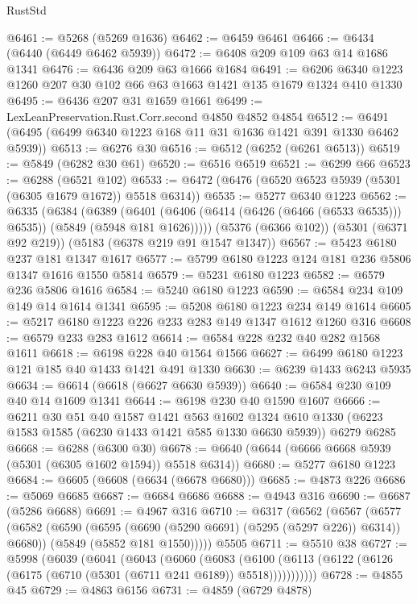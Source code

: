 \begin{lexlean}{RustStd}
\begin{coremodule}
@6461 := @5268 (@5269 @1636)
@6462 := @6459 @6461
@6466 := @6434 (@6440 (@6449 @6462 @5939))
@6472 := @6408 @209 @109 @63 @14 @1686 @1341
@6476 := @6436 @209 @63 @1666 @1684
@6491 := @6206 @6340 @1223 @1260 @207 @30 @102 @66 @63 @1663 @1421 @135 @1679 @1324 @410 @1330
@6495 := @6436 @207 @31 @1659 @1661
@6499 := LexLeanPreservation.Rust.Corr.second @4850 @4852 @4854
@6512 := @6491 (@6495 (@6499 @6340 @1223 @168 @11 @31 @1636 @1421 @391 @1330 @6462 @5939))
@6513 := @6276 @30
@6516 := @6512 (@6252 (@6261 @6513))
@6519 := @5849 (@6282 @30 @61)
@6520 := @6516 @6519
@6521 := @6299 @66
@6523 := @6288 (@6521 @102)
@6533 := @6472 (@6476 (@6520 @6523 @5939 (@5301 (@6305 @1679 @1672)) @5518 @6314))
@6535 := @5277 @6340 @1223
@6562 := @6335
    (@6384
      (@6389
        (@6401 (@6406 (@6414 (@6426 (@6466 (@6533 @6535))) @6535)) (@5849 (@5948 @181 @1626)))))
    (@5376 (@6366 @102))
    (@5301 (@6371 @92 @219))
    (@5183 (@6378 @219 @91 @1547 @1347))
@6567 := @5423 @6180 @237 @181 @1347 @1617
@6577 := @5799 @6180 @1223 @124 @181 @236 @5806 @1347 @1616 @1550 @5814
@6579 := @5231 @6180 @1223
@6582 := @6579 @236 @5806 @1616
@6584 := @5240 @6180 @1223
@6590 := @6584 @234 @109 @149 @14 @1614 @1341
@6595 := @5208 @6180 @1223 @234 @149 @1614
@6605 := @5217 @6180 @1223 @226 @233 @283 @149 @1347 @1612 @1260 @316
@6608 := @6579 @233 @283 @1612
@6614 := @6584 @228 @232 @40 @282 @1568 @1611
@6618 := @6198 @228 @40 @1564 @1566
@6627 := @6499 @6180 @1223 @121 @185 @40 @1433 @1421 @491 @1330
@6630 := @6239 @1433 @6243 @5935
@6634 := @6614 (@6618 (@6627 @6630 @5939))
@6640 := @6584 @230 @109 @40 @14 @1609 @1341
@6644 := @6198 @230 @40 @1590 @1607
@6666 := @6211
    @30
    @51
    @40
    @1587
    @1421
    @563
    @1602
    @1324
    @610
    @1330
    (@6223 @1583 @1585 (@6230 @1433 @1421 @585 @1330 @6630 @5939))
    @6279
    @6285
@6668 := @6288 (@6300 @30)
@6678 := @6640 (@6644 (@6666 @6668 @5939 (@5301 (@6305 @1602 @1594)) @5518 @6314))
@6680 := @5277 @6180 @1223
@6684 := @6605 (@6608 (@6634 (@6678 @6680)))
@6685 := @4873 @226
@6686 := @5069 @6685
@6687 := @6684 @6686
@6688 := @4943 @316
@6690 := @6687 (@5286 @6688)
@6691 := @4967 @316
@6710 := @6317
    (@6562
      (@6567
        (@6577
          (@6582 (@6590 (@6595 (@6690 (@5290 @6691) (@5295 (@5297 @226)) @6314)) @6680))
          (@5849 (@5852 @181 @1550)))))
    @5505
@6711 := @5510 @38
@6727 := @5998
    (@6039
      (@6041
        (@6043
          (@6060
            (@6083
              (@6100 (@6113 (@6122 (@6126 (@6175 (@6710 (@5301 (@6711 @241 @6189)) @5518)))))))))))
@6728 := @4855 @45
@6729 := @4863 @6156
@6731 := @4859 (@6729 @4878)

\end{coremodule}
\end{lexlean}
